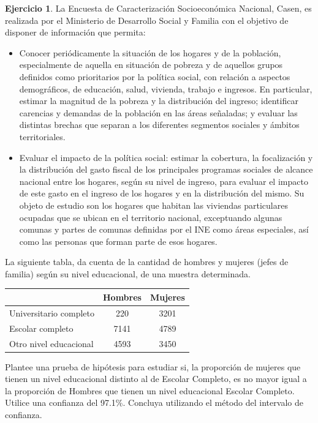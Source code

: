 \documentclass[
  11pt,
]{book}
\theoremstyle{definition}
\theoremstyle{definition}
\theoremstyle{definition}
\newtheorem{exercise}{Ejercicio}[chapter]
\theoremstyle{definition}
\theoremstyle{remark}
\begin{document}
\begin{exercise}
La Encuesta de Caracterización Socioeconómica Nacional, Casen, es realizada por el Ministerio de Desarrollo Social y Familia con el objetivo de disponer de información que permita:

\begin{itemize}
\item
  Conocer periódicamente la situación de los hogares y de la población, especialmente de aquella en situación de pobreza y de aquellos grupos definidos como prioritarios por la política social, con relación a aspectos demográficos, de educación, salud, vivienda, trabajo e ingresos. En particular, estimar la magnitud de la pobreza y la distribución del ingreso; identificar carencias y demandas de la población en las áreas señaladas; y evaluar las distintas brechas que separan a los diferentes segmentos sociales y ámbitos territoriales.
\item
  Evaluar el impacto de la política social: estimar la cobertura, la focalización y la distribución del gasto fiscal de los principales programas sociales de alcance nacional entre los hogares, según su nivel de ingreso, para evaluar el impacto de este gasto en el ingreso de los hogares y en la distribución del mismo.
  Su objeto de estudio son los hogares que habitan las viviendas particulares ocupadas que se ubican en el territorio nacional, exceptuando algunas comunas y partes de comunas definidas por el INE como áreas especiales, así como las personas que forman parte de esos hogares.
\end{itemize}

La siguiente tabla, da cuenta de la cantidad de hombres y mujeres (jefes de familia) según su nivel educacional, de una muestra determinada.

\begin{table}[H]
\centering
\begin{tabular}[t]{lcc}
\toprule
  & Hombres & Mujeres\\
\midrule
Universitario completo & 220 & 3201\\
Escolar completo & 7141 & 4789\\
Otro nivel educacional & 4593 & 3450\\
\bottomrule
\end{tabular}
\end{table}

Plantee una prueba de hipótesis para estudiar si, la proporción de mujeres que tienen un nivel educacional distinto al de Escolar Completo, es no mayor igual a la proporción de Hombres que tienen un nivel educacional Escolar Completo. Utilice una confianza del 97.1\%. Concluya utilizando el método del intervalo de confianza.
\end{exercise}
\end{document}
